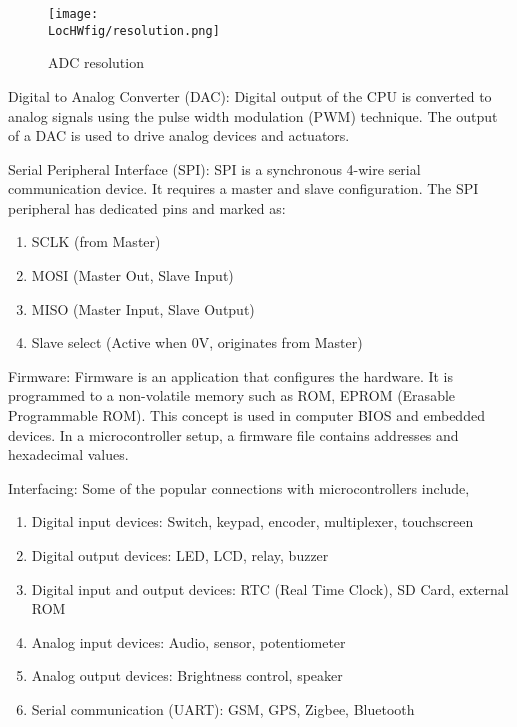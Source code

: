 \begin{description}
        \begin{figure}
          \centering
          \texttt{[image: \\LocHWfig/resolution.png]}
          \caption{ADC resolution}
          \label{resolution}
        \end{figure}

  \item {Digital to Analog Converter (DAC):} Digital output of the CPU is
        converted to analog signals using the pulse width modulation (PWM)
        technique. The output of a DAC is used to drive analog devices and actuators.

  \item {Serial Peripheral Interface (SPI):} SPI is a synchronous 4-wire
        serial communication device. It requires a master and slave
        configuration. The SPI peripheral has dedicated pins and marked
        as:
        \begin{enumerate}
          \item SCLK (from Master)
          \item MOSI (Master Out, Slave Input)
          \item MISO (Master Input, Slave Output)
          \item Slave select (Active when 0V, originates from Master)
        \end{enumerate}

  \item {Firmware:} Firmware is an application that configures the
        hardware. It is programmed to a non-volatile memory such as ROM,
        EPROM (Erasable Programmable ROM). This concept is used in computer
        BIOS and embedded devices.  In a microcontroller setup, a firmware
        file contains addresses and hexadecimal values.

  \item{Interfacing:} Some of the popular connections with microcontrollers include,
        \begin{enumerate}
          \item Digital input devices: Switch, keypad, encoder, multiplexer,
                touchscreen
          \item Digital output devices: LED, LCD, relay, buzzer
          \item Digital input and output devices: RTC (Real Time Clock),
                SD Card, external ROM
          \item Analog input devices: Audio, sensor, potentiometer
          \item Analog output devices: Brightness control, speaker
          \item Serial communication (UART): GSM, GPS, Zigbee, Bluetooth
        \end{enumerate}
\end{description}


